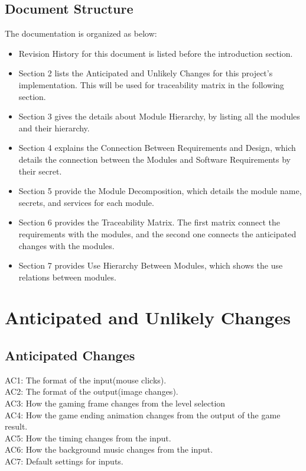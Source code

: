 \documentclass[12pt, titlepage]{article}
\begin{document}
\subsection{Document Structure}
The documentation is organized as below:
\begin{itemize}
    \item Revision History for this document is listed before the introduction section.
    \item Section 2 lists the Anticipated and Unlikely Changes for this project's implementation. This will be used for traceability matrix in the following section.
    \item Section 3 gives the details about Module Hierarchy, by listing all the modules and their hierarchy.
    \item Section 4 explains the Connection Between Requirements and Design, which details the connection between the Modules and Software Requirements by their secret.
    \item Section 5 provide the Module Decomposition, which details the module name, secrets, and services for each module.
    \item Section 6 provides the Traceability Matrix. The first matrix connect the requirements with the modules, and the second one connects the anticipated changes with the modules.
    \item Section 7 provides Use Hierarchy Between Modules, which shows the use relations between modules.
\end{itemize}
\section{Anticipated and Unlikely Changes} \label{SecChange}
\subsection{Anticipated Changes}
AC1: The format of the input(mouse clicks).\\
AC2: The format of the output(image changes).\\
AC3: How the gaming frame changes from the level selection\\
AC4: How the game ending animation changes from the output of the game result.\\
AC5: How the timing changes from the input.\\
AC6: How the background music changes from the input.\\
AC7: Default settings for inputs.\\
\end{document}
